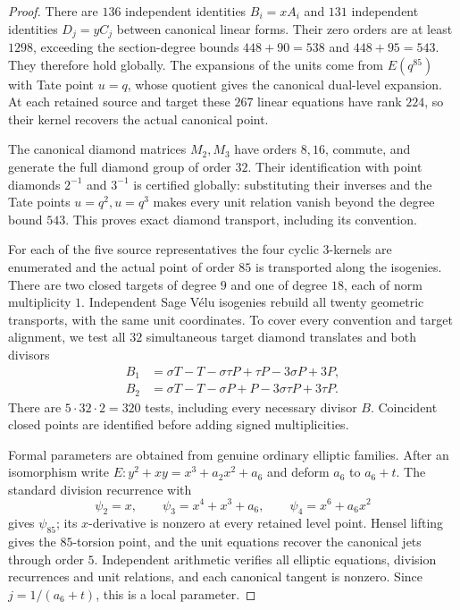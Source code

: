 \begin{proof}
There are $136$ independent identities $B_i=xA_i$ and $131$ independent identities $D_j=yC_j$ between canonical linear forms. Their zero orders are at least $1298$, exceeding the section-degree bounds $448+90=538$ and $448+95=543$. They therefore hold globally. The expansions of the units come from $E(q^{85})$ with Tate point $u=q$, whose quotient gives the canonical dual-level expansion. At each retained source and target these $267$ linear equations have rank $224$, so their kernel recovers the actual canonical point.

The canonical diamond matrices $M_2,M_3$ have orders $8,16$, commute, and generate the full diamond group of order $32$. Their identification with point diamonds $2^{-1}$ and $3^{-1}$ is certified globally: substituting their inverses and the Tate points $u=q^2,u=q^3$ makes every unit relation vanish beyond the degree bound $543$. This proves exact diamond transport, including its convention.

For each of the five source representatives the four cyclic $3$-kernels are enumerated and the actual point of order $85$ is transported along the isogenies. There are two closed targets of degree $9$ and one of degree $18$, each of norm multiplicity $1$. Independent Sage V\'elu isogenies rebuild all twenty geometric transports, with the same unit coordinates. To cover every convention and target alignment, we test all $32$ simultaneous target diamond translates and both divisors
\[
 \begin{split}
 B_1&=\sigma T-T-\sigma\tau P+\tau P-3\sigma P+3P,\\
 B_2&=\sigma T-T-\sigma P+P-3\sigma\tau P+3\tau P.
 \end{split}
\]
There are $5\cdot32\cdot2=320$ tests, including every necessary divisor $B$. Coincident closed points are identified before adding signed multiplicities.

Formal parameters are obtained from genuine ordinary elliptic families. After an isomorphism write $E:y^2+xy=x^3+a_2x^2+a_6$ and deform $a_6$ to $a_6+t$. The standard division recurrence with
\[
 \psi_2=x,\qquad\psi_3=x^4+x^3+a_6,\qquad\psi_4=x^6+a_6x^2
\]
gives $\psi_{85}$; its $x$-derivative is nonzero at every retained level point. Hensel lifting gives the $85$-torsion point, and the unit equations recover the canonical jets through order $5$. Independent arithmetic verifies all elliptic equations, division recurrences and unit relations, and each canonical tangent is nonzero. Since $j=1/(a_6+t)$, this is a local parameter.


\end{proof}
